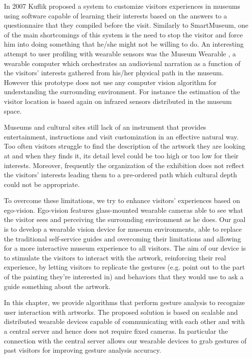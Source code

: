 In 2007 Kuflik \etal \cite{kuflik2011visitor} proposed a system to customize visitors experiences in museums using software capable of learning their interests based on the answers to a questionnaire that they compiled before the visit. Similarly to SmartMuseum, one of the main shortcomings of this system is the need to stop the visitor and force him into doing something that he/she might not be willing to do.
An interesting attempt to user profiling with wearable sensors was the Museum Wearable \cite{sparacino2002museum}, a wearable computer which orchestrates an audiovisual narration as a function of the visitors' interests gathered from his/her physical path in the museum. However this prototype does not use any computer vision algorithm for understanding the surrounding environment. For instance the estimation of the visitor location is based again on infrared sensors distributed in the museum space.

Museums and cultural sites still lack of an instrument that provides entertainment, instructions and visit customization in an effective natural way. Too often visitors struggle to find the description of the artwork they are looking at and when they finds it, its detail level could be too high or too low for their interests. Moreover, frequently the organization of the exhibition does not reflect the visitors' interests leading them to a pre-ordered path which cultural depth could not be appropriate.

To overcome these limitations, we try to enhance visitors' experiences based on ego-vision. Ego-vision features glass-mounted wearable cameras able to see what the visitor sees and perceiving the surrounding environment as he does. Our goal is to develop a wearable vision device for museum environments, able to replace the traditional self-service guides and overcoming their limitations and allowing for a more interactive museum experience to all visitors. The aim of our device is to stimulate the visitors to interact with the artwork, reinforcing their real experience, by letting visitors to replicate the gestures (e.g. point out to the part of the painting they're interested in) and behaviors that they would use to ask a guide something about the artwork.

In this chapter, we provide algorithms that perform gesture analysis to recognize user interaction with artworks. The proposed solution is based on scalable and distributed wearable devices capable of communicating with each other and with a central server and hence does not require fixed cameras.
In particular the connection with the central server allows our wearable devices to grab gestures of past visitors for improving gesture analysis accuracy.

